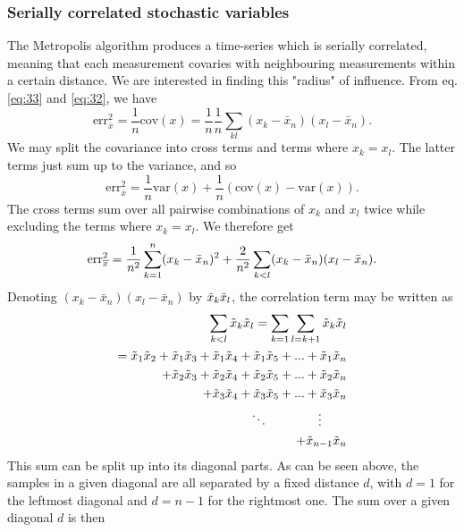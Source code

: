 \documentclass[
    a4paper, aps, twocolumn, floatfix, superscriptaddress,
    nofootinbib]{revtex4-1}
\begin{document}
\subsubsection{Serially correlated stochastic variables}
The Metropolis algorithm produces a time-series which is serially correlated, meaning that each measurement covaries with neighbouring measurements within a certain distance. We are interested in finding this "radius" of influence. From eq. \eqref{eq:33} and \eqref{eq:32}, we have
\begin{equation}
    \text{err}_{\overline{x}}^2 = \frac{1}{n} \text{cov}(x) = \frac{1}{n}\frac{1}{n}\sum_{kl}(x_k - \bar{x}_n) (x_l - \bar{x}_n).
\end{equation}
We may split the covariance into cross terms and terms where $x_k = x_l$. The latter terms just sum up to the variance, and so 
\begin{equation}
    \text{err}_{\overline{x}}^2 = \frac{1}{n} \text{var}(x) + \frac{1}{n}(\text{cov}(x)-\text{var}(x)).
\end{equation}
The cross terms sum over all pairwise combinations of $x_k$ and $x_l$ twice while excluding the terms where $x_k = x_l$. We therefore get 
\begin{equation}\label{eq:36}
    \text{err}_{\overline{x}}^2=\frac{1}{n^2} \sum_{k=1}^n (x_k - \Bar{x}_n)^2 + \frac{2}{n^2}\sum_{k<l}(x_k - \Bar{x}_n)(x_l-\Bar{x}_n).
\end{equation}
Denoting $(x_k - \bar{x}_n)(x_l - \bar{x}_n)$ by $\Tilde{x}_k\Tilde{x}_l$, the correlation term may be written as 
\begin{align}\label{eq:34}
    \sum_{k<l}  \Tilde{x}_k\Tilde{x}_l=\sum_{k=1}\sum_{l=k+1} \Tilde{x}_k\Tilde{x}_l& \\
    = \Tilde{x}_1\Tilde{x}_2+\Tilde{x}_1\Tilde{x}_3+\Tilde{x}_1\Tilde{x}_4+\Tilde{x}_1\Tilde{x}_5+...+\Tilde{x}_1\Tilde{x}_n& \nonumber \\
    + \Tilde{x}_2\Tilde{x}_3+\Tilde{x}_2\Tilde{x}_4+\Tilde{x}_2\Tilde{x}_5+...+\Tilde{x}_2\Tilde{x}_n& \nonumber \\
     + \Tilde{x}_{3}\Tilde{x}_{4}+\Tilde{x}_3\Tilde{x}_5 +...+ \Tilde{x}_{3}\Tilde{x}_{n}& \nonumber \\
     \ddots \qquad \qquad \vdots \qquad& \nonumber \\
    +\Tilde{x}_{n-1}\Tilde{x}_n \nonumber
\end{align}
This sum can be split up into its diagonal parts. As can be seen above, the samples in a given diagonal are all separated by a fixed distance $d$, with $d=1$ for the leftmost diagonal and $d=n-1$ for the rightmost one. The sum over a given diagonal $d$ is then 
\end{document}
